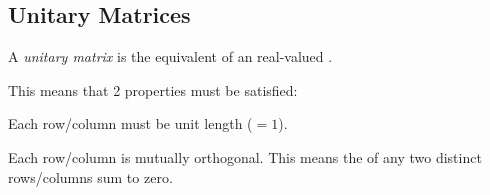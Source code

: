 \subsection{Unitary Matrices}\label{subsec:Unitary_Matrices}
\begin{definition}\label{def:Unitary_Matrix}
  A \emph{unitary matrix} is the  equivalent of an  real-valued .

  This means that 2 properties must be satisfied:
  \begin{propertylist}
  \item Each row/column must be unit length ($=1$).\label{prop:Unitary_Matrix-Unit_Length}
  \item Each row/column is mutually orthogonal.
    This means the  of any two distinct rows/columns sum to zero.\label{prop:Unitary_Matrix-Mutually_Orthogonal}
  \end{propertylist}
\end{definition}


